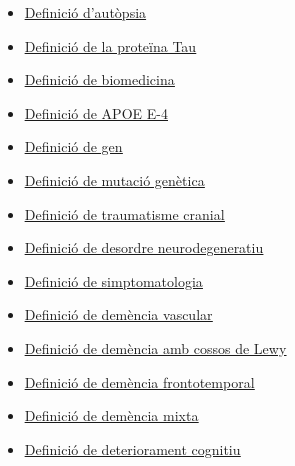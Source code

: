 \documentclass[a4paper,12pt]{article}
\begin{document}
\begin{itemize}
    \item \href{https://peritojudicial.com/autopsia-necropsia/#Cu%E1l%20es%20la%20diferencia%20entre%20Autopsia%20y%20Necropsia%20%09}{\underline{Definició d'autòpsia}}
    \item \href{https://konexionalzheimer.com/la-proteina-tau-y-el-alzheimer/}{\underline{Definició de la proteïna Tau}}
    \item \href{https://www.aprendemas.com/co/blog/orientacion-academica/que-es-la-biomedicina-razones-para-dedicarse-profesionalmente-84318}{\underline{Definició de biomedicina}}
    \item \href{https://medlineplus.gov/genetics/gene/apoe/}{\underline{Definició de APOE E-4}}
    \item \href{https://www.genome.gov/es/genetics-glossary/Gen}{\underline{Definició de gen}}
    \item \href{https://kidshealth.org/es/parents/gene-mutations.html}{\underline{Definició de mutació genètica}}
    \item \href{https://medlineplus.gov/spanish/ency/article/000028.htm#:~:text=Un%20traumatismo%20craneal%20cerrado%20significa,cráneo%20e%20ingresó%20al%20cerebro.}{\underline{Definició de traumatisme cranial}}
    \item \href{https://www.cancer.gov/espanol/publicaciones/diccionarios/diccionario-cancer/def/trastorno-neurodegenerativo}{\underline{Definició de desordre neurodegeneratiu}}
    \item \href{https://definicion.de/sintomatologia/}{\underline{Definició de simptomatologia}}
    \item \href{https://www.alzheimers.gov/es/alzheimer-demencias/demencia-vascular}{\underline{Definició de demència vascular}}
    \item \href{https://www.mayoclinic.org/es-es/diseases-conditions/lewy-body-dementia/symptoms-causes/syc-20352025}{\underline{Definició de demència amb cossos de Lewy}}
    \item \href{https://www.mayoclinic.org/es-es/diseases-conditions/frontotemporal-dementia/symptoms-causes/syc-20354737#:~:text=Descripci%C3%B3n%20general,la%20conducta%20y%20el%20lenguaje.}{\underline{Definició de demència frontotemporal}}
    \item \href{https://www.universidadviu.com/es/actualidad/nuestros-expertos/demencia-mixta-causas-sintomas-y-tratamientos#:~:text=La%20demencia%20mixta%20es%20un,Alzheimer%20y%20de%20demencia%20vascular.}{\underline{Definició de demència mixta}}
    \item \href{https://www.cancer.gov/espanol/publicaciones/diccionarios/diccionario-cancer/def/deterioro-cognitivo}{\underline{Definició de deteriorament cognitiu}}

\end{itemize}
\end{document}
